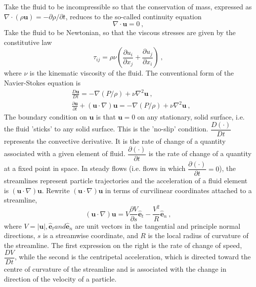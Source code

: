 \documentclass[12pt,a4paper]{article}
\renewcommand{\vec}[1]{\boldsymbol{#1}}
\begin{document}
Take the fluid to be incompressible so that the conservation of mass, expressed as $\nabla \cdot (\rho \vec{u}) = -\partial \rho/\partial t$, reduces to the so-called continuity equation
\begin{equation}
\nabla \cdot \vec{u} = 0 ~,
\end{equation}
Take the fluid to be Newtonian, so that the viscous stresses are given by the constitutive law
\begin{equation}
\tau_{ij} = \rho \nu \left(\frac{\partial u_i}{\partial x_j} +\frac{\partial u_j}{\partial x_i} \right) ~,
\end{equation}
where $\nu$ is the kinematic viscosity of the fluid. The conventional form of the Navier-Stokes equation is
\begin{align}
& \frac{D \vec{u}}{D t} = -\nabla (P/\rho) +\nu \nabla^2 \vec{u} ~, \\
& \frac{\partial \vec{u}}{\partial t} +(\vec{u}\cdot \nabla)\vec{u} = -\nabla (P/\rho) +\nu \nabla^2 \vec{u} ~,
\end{align}
The boundary condition on $\vec{u}$ is that $\vec{u} = 0$ on any stationary, solid surface, i.e. the fluid 'sticks' to any solid surface. This is the 'no-slip' condition. $\dfrac{D (\cdot )}{D t}$ represents the convective derivative. It is the rate of change of a quantity associated with a given element of fluid. $\dfrac{\partial (\cdot)}{\partial t}$ is the rate of change of a quantity at a fixed point in space. In steady flows (i.e. flows in which $\dfrac{\partial (\cdot)}{\partial t} = 0$), the streamlines represent particle trajectories and the acceleration of a fluid element is $(\vec{u}\cdot \nabla)\vec{u}$. Rewrite $(\vec{u}\cdot \nabla)\vec{u}$ in terms of curvilinear coordinates attached to a streamline,
\begin{equation}
(\vec{u}\cdot \nabla)\vec{u} = V\frac{\partial V}{\partial s} \hat{\vec{e}}_t -\frac{V^2}{R} \hat{\vec{e}}_n ~,
\end{equation}
where $V = |\vec{u}|, \hat{\vec{e}}_t and \hat{\vec{e}}_n$ are unit vectors in the tangential and principle normal directions, $s$ is a streamwise coordinate, and $R$ is the local radius of curvature of the streamline. The first expression on the right is the rate of change of speed, $\dfrac{D V}{D t}$, while the second is the centripetal acceleration, which is directed toward the centre of curvature of the streamline and is associated with the change in direction of the velocity of a particle.
\end{document}
